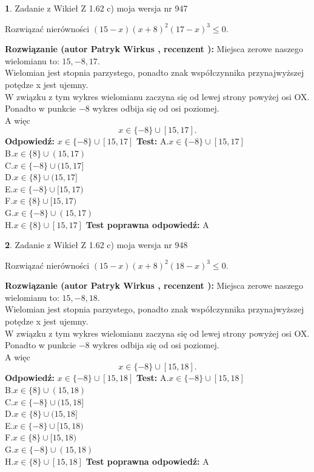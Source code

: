 \documentclass[12pt, a4paper]{article}
\theoremstyle{definition} %
\newtheorem{zad}{}
\newcommand{\zadStart}[1]{\begin{zad}#1\newline}
\newcommand{\zadStop}{\end{zad}}
\newcommand{\rozwStart}[2]{\noindent \textbf{Rozwiązanie (autor #1 , recenzent #2): }\newline}
\newcommand{\rozwStop}{\newline}
\newcommand{\odpStart}{\noindent \textbf{Odpowiedź:}\newline}
\newcommand{\odpStop}{\newline}
\newcommand{\testStart}{\noindent \textbf{Test:}\newline}
\newcommand{\testStop}{\newline}
\newcommand{\kluczStart}{\noindent \textbf{Test poprawna odpowiedź:}\newline}
\newcommand{\kluczStop}{\newline}
\begin{document}
\zadStart{Zadanie z Wikieł Z 1.62 c) moja wersja nr 947}

Rozwiązać nierówności $(15-x)(x+8)^{2}(17-x)^{3}\le0$.
\zadStop
\rozwStart{Patryk Wirkus}{}
Miejsca zerowe naszego wielomianu to: $15, -8, 17$.\\
Wielomian jest stopnia parzystego, ponadto znak współczynnika przy\linebreak najwyższej potędze x jest ujemny.\\ W związku z tym wykres wielomianu zaczyna się od lewej strony powyżej osi OX.\\
Ponadto w punkcie $-8$ wykres odbija się od osi poziomej.\\
A więc $$x \in \{-8\} \cup [15,17].$$
\rozwStop
\odpStart
$x \in \{-8\} \cup [15,17]$
\odpStop
\testStart
A.$x \in \{-8\} \cup [15,17]$\\
B.$x \in \{8\} \cup (15,17)$\\
C.$x \in \{-8\} \cup (15,17]$\\
D.$x \in \{8\} \cup (15,17]$\\
E.$x \in \{-8\} \cup [15,17)$\\
F.$x \in \{8\} \cup [15,17)$\\
G.$x \in \{-8\} \cup (15,17)$\\
H.$x \in \{8\} \cup [15,17]$
\testStop
\kluczStart
A
\kluczStop



\zadStart{Zadanie z Wikieł Z 1.62 c) moja wersja nr 948}

Rozwiązać nierówności $(15-x)(x+8)^{2}(18-x)^{3}\le0$.
\zadStop
\rozwStart{Patryk Wirkus}{}
Miejsca zerowe naszego wielomianu to: $15, -8, 18$.\\
Wielomian jest stopnia parzystego, ponadto znak współczynnika przy\linebreak najwyższej potędze x jest ujemny.\\ W związku z tym wykres wielomianu zaczyna się od lewej strony powyżej osi OX.\\
Ponadto w punkcie $-8$ wykres odbija się od osi poziomej.\\
A więc $$x \in \{-8\} \cup [15,18].$$
\rozwStop
\odpStart
$x \in \{-8\} \cup [15,18]$
\odpStop
\testStart
A.$x \in \{-8\} \cup [15,18]$\\
B.$x \in \{8\} \cup (15,18)$\\
C.$x \in \{-8\} \cup (15,18]$\\
D.$x \in \{8\} \cup (15,18]$\\
E.$x \in \{-8\} \cup [15,18)$\\
F.$x \in \{8\} \cup [15,18)$\\
G.$x \in \{-8\} \cup (15,18)$\\
H.$x \in \{8\} \cup [15,18]$
\testStop
\kluczStart
A
\kluczStop
\end{document}
